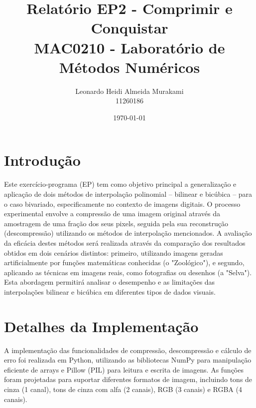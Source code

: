 \documentclass[12pt, a4paper]{article}
\title{Relatório EP2 - Comprimir e Conquistar \\ \large MAC0210 - Laboratório de Métodos Numéricos}
\author{Leonardo Heidi Almeida Murakami \\ 11260186}
\date{\today}
\begin{document}
\maketitle
\tableofcontents
\newpage

\section{Introdução}
Este exercício-programa (EP) tem como objetivo principal a generalização e aplicação de dois métodos de interpolação polinomial – bilinear e bicúbica – para o caso bivariado, especificamente no contexto de imagens digitais. 
O processo experimental envolve a compressão de uma imagem original através da amostragem de uma fração dos seus pixels, seguida pela sua reconstrução (descompressão) utilizando os métodos de interpolação mencionados. 
A avaliação da eficácia destes métodos será realizada através da comparação dos resultados obtidos em dois cenários distintos: primeiro, utilizando imagens geradas artificialmente por funções matemáticas conhecidas (o "Zoológico"), e segundo, aplicando as técnicas em imagens reais, como fotografias ou desenhos (a "Selva"). 
Esta abordagem permitirá analisar o desempenho e as limitações das interpolações bilinear e bicúbica em diferentes tipos de dados visuais.


\section{Detalhes da Implementação}
A implementação das funcionalidades de compressão, descompressão e cálculo de erro foi realizada em Python, utilizando as bibliotecas NumPy para manipulação eficiente de arrays e Pillow (PIL) para leitura e escrita de imagens. As funções foram projetadas para suportar diferentes formatos de imagem, incluindo tons de cinza (1 canal), tons de cinza com alfa (2 canais), RGB (3 canais) e RGBA (4 canais).
\end{document}
